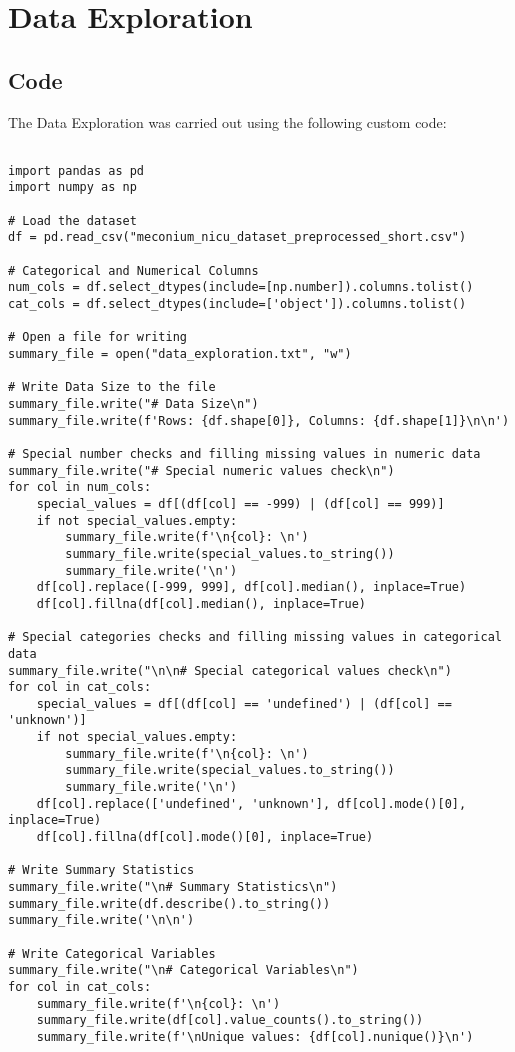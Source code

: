 \documentclass[11pt]{article}
\begin{document}
\section{Data Exploration} \subsection{Code}The Data Exploration was carried out using the following custom code:

\begin{verbatim}

import pandas as pd
import numpy as np

# Load the dataset
df = pd.read_csv("meconium_nicu_dataset_preprocessed_short.csv")

# Categorical and Numerical Columns
num_cols = df.select_dtypes(include=[np.number]).columns.tolist()
cat_cols = df.select_dtypes(include=['object']).columns.tolist()

# Open a file for writing
summary_file = open("data_exploration.txt", "w")

# Write Data Size to the file
summary_file.write("# Data Size\n")
summary_file.write(f'Rows: {df.shape[0]}, Columns: {df.shape[1]}\n\n')

# Special number checks and filling missing values in numeric data
summary_file.write("# Special numeric values check\n")
for col in num_cols:
    special_values = df[(df[col] == -999) | (df[col] == 999)]
    if not special_values.empty:
        summary_file.write(f'\n{col}: \n')
        summary_file.write(special_values.to_string())
        summary_file.write('\n')
    df[col].replace([-999, 999], df[col].median(), inplace=True)
    df[col].fillna(df[col].median(), inplace=True)

# Special categories checks and filling missing values in categorical data
summary_file.write("\n\n# Special categorical values check\n")
for col in cat_cols:
    special_values = df[(df[col] == 'undefined') | (df[col] == 'unknown')]
    if not special_values.empty:
        summary_file.write(f'\n{col}: \n')
        summary_file.write(special_values.to_string())
        summary_file.write('\n')
    df[col].replace(['undefined', 'unknown'], df[col].mode()[0], inplace=True)
    df[col].fillna(df[col].mode()[0], inplace=True)

# Write Summary Statistics
summary_file.write("\n# Summary Statistics\n")
summary_file.write(df.describe().to_string())
summary_file.write('\n\n')

# Write Categorical Variables
summary_file.write("\n# Categorical Variables\n")
for col in cat_cols:
    summary_file.write(f'\n{col}: \n')
    summary_file.write(df[col].value_counts().to_string())
    summary_file.write(f'\nUnique values: {df[col].nunique()}\n')


\end{verbatim}
\end{document}
